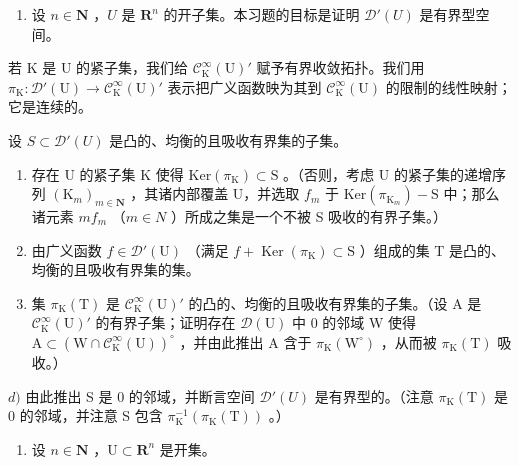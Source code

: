\begin{enumerate}
\def\labelenumi{\arabic{enumi})}
\setcounter{enumi}{17}
\tightlist
\item
  设 \(n \in \mathbf{N}\) ，\(U\) 是 \(\mathbf{R}^n\) 的开子集。本习题的目标是证明 \(\mathcal{D}'(U)\) 是有界型空间。
\end{enumerate}

若 K 是 U 的紧子集，我们给 \(\mathcal{C}_{\mathrm{K}}^{\infty}(\mathrm{U})'\) 赋予有界收敛拓扑。我们用 \(\pi_{\mathrm{K}}\colon\mathcal{D}'(\mathrm{U})\to\mathcal{C}_{\mathrm{K}}^{\infty}(\mathrm{U})'\) 表示把广义函数映为其到 \(\mathcal{C}_{\mathrm{K}}^{\infty}(\mathrm{U})\) 的限制的线性映射；它是连续的。

设 \(S \subset \mathcal{D}'(U)\) 是凸的、均衡的且吸收有界集的子集。

\begin{enumerate}
\def\labelenumi{\alph{enumi})}
\item
  存在 U 的紧子集 K 使得 \(\mathrm{Ker}(\pi_{\mathrm{K}}) \subset \mathrm{S}\) 。（否则，考虑 U 的紧子集的递增序列 \((\mathrm{K}_{m})_{m \in \mathbf{N}}\) ，其诸内部覆盖 U，并选取 \(f_{m}\) 于 \(\mathrm{Ker}(\pi_{\mathrm{K}_{m}}) - \mathrm{S}\) 中；那么诸元素 \(mf_{m}\) （\(m \in N\) ）所成之集是一个不被 S 吸收的有界子集。）
\item
  由广义函数 \(f \in \mathcal{D}'(\mathrm{U})\) （满足 \(f + \operatorname{Ker}(\pi_{\mathrm{K}}) \subset \mathrm{S}\) ）组成的集 T 是凸的、均衡的且吸收有界集的集。
\item
  集 \(\pi_{\mathrm{K}}(\mathrm{T})\) 是 \(\mathcal{C}_{\mathrm{K}}^{\infty}(\mathrm{U})'\) 的凸的、均衡的且吸收有界集的子集。（设 A 是 \(\mathcal{C}_{\mathrm{K}}^{\infty}(\mathrm{U})'\) 的有界子集；证明存在 \(\mathcal{D}(\mathrm{U})\) 中 0 的邻域 W 使得 \(\mathrm{A} \subset (\mathrm{W} \cap \mathcal{C}_{\mathrm{K}}^{\infty}(\mathrm{U}))^{\circ}\) ，并由此推出 A 含于 \(\pi_{\mathrm{K}}(\mathrm{W}^{\circ})\) ，从而被 \(\pi_{\mathrm{K}}(\mathrm{T})\) 吸收。）
\end{enumerate}

\(d)\) 由此推出 S 是 0 的邻域，并断言空间 \(\mathcal{D}'(U)\) 是有界型的。（注意 \(\pi_{\mathrm{K}}(\mathrm{T})\) 是 0 的邻域，并注意 S 包含 \(\pi_{\mathrm{K}}^{-1}(\pi_{\mathrm{K}}(\mathrm{T}))\) 。）

\begin{enumerate}
\def\labelenumi{\arabic{enumi})}
\setcounter{enumi}{18}
\tightlist
\item
  设 \(n \in \mathbf{N}\) ，\(\mathrm{U} \subset \mathbf{R}^n\) 是开集。
\end{enumerate}

